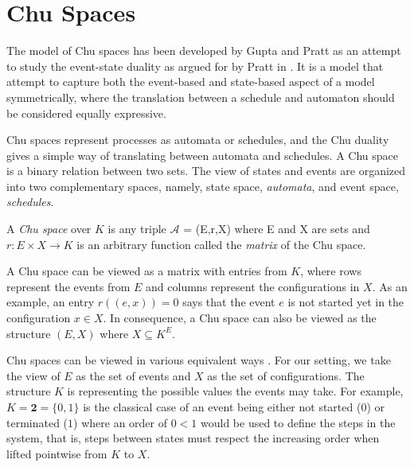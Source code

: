 \section{Chu Spaces}
\label{sec:Chu-spaces}
    The model of Chu spaces has been developed by Gupta and Pratt \cite{gupta94phd_Chu, pratt95Chu, Pratt00Sculptures} as an attempt to study the event-state duality as argued for by Pratt in \cite{Pratt02eventStateDuality}. It is a model that attempt to capture both the event-based and state-based aspect of a model symmetrically, where the translation between a schedule and automaton should be considered equally expressive.
    
    Chu spaces represent processes as automata or schedules, and the Chu duality gives a simple way of translating between automata and schedules. A Chu space is a binary relation between two sets. The view of states and events are organized into two complementary spaces, namely, state space, \emph{automata}, and event space, \emph{schedules}.
        
    \begin{definition}
        \label{def:Chu_spaces}
        A \emph{Chu space} over $K$ is any triple $\mathcal{A}$ = (E,r,X) where E and X are sets and $r: E \times X \rightarrow K$ is an arbitrary function called the \emph{matrix} of the Chu space.
    \end{definition}
    
    A Chu space can be viewed as a matrix with entries from $K$, where rows represent the events from $E$ and columns represent the configurations in $X$.  As an example, an entry $r((e,x))=0$ says that the event $e$ is not started yet in the configuration $x\in X$.  In consequence, a Chu space can also be viewed as the structure $(E,X)$ where $X\subseteq K^{E}$. %
    
    Chu spaces can be viewed in various equivalent ways \cite[Chapter 5]{gupta94phd_Chu}.  For our setting, we take the view of $E$ as the set of events and $X$ as the set of configurations. The structure $K$ is representing the possible values the events may take. For example, $K= \mathbf{2}= \{0,1\}$ is the classical case of an event being either not started ($0$) or terminated ($1$) where an order of $0 < 1$ would be used to define the steps in the system, that is, steps between states must respect the increasing order when lifted pointwise from $K$ to $X$.
    
